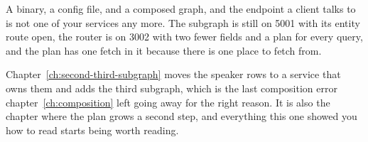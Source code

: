 %
A binary, a config file, and a composed graph, and the endpoint a client talks
to is not one of your services any more. The subgraph is still on 5001 with its
entity route open, the router is on 3002 with two fewer fields and a plan for
every query, and the plan has one fetch in it because there is one place to
fetch from.

%
Chapter~\ref{ch:second-third-subgraph} moves the speaker rows to a service that
owns them and adds the third subgraph, which is the last composition error
chapter~\ref{ch:composition} left going away for the right reason. It is also
the chapter where the plan grows a second step, and everything this one showed
you how to read starts being worth reading.
%
